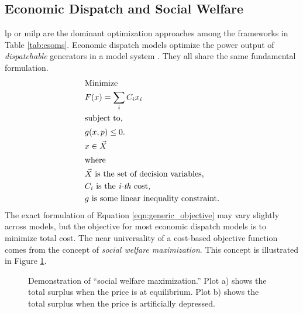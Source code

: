 \subsection{Economic Dispatch and Social Welfare}
\Ac{lp} or \ac{milp} are the dominant optimization approaches among the frameworks in 
Table \ref{tab:esoms}. Economic dispatch models optimize the power output of 
\textit{dispatchable} generators in a model system \cite{de_queiroz_repurposing_2019,
neumann_near-optimal_2021}. They all share the same fundamental formulation.
\begin{align}
    \intertext{Minimize}
    \label{eqn:generic_objective}
    &F(x) = \sum_i C_i x_i\\
    \intertext{subject to,}
    &g(x, p) \leq 0.\nonumber\\
    &x \in \vec{X}\nonumber\\
    \intertext{where}
    &\vec{X} \text{ is the set of decision variables,}\nonumber\\
    & C_i \text{ is the \textit{i-th} cost,}\nonumber\\
    & g \text{ is some linear inequality constraint.}\nonumber
\end{align}
The exact formulation of Equation \ref{eqn:generic_objective} may vary slightly 
across models, but the objective for most economic dispatch models is to minimize 
total cost. The near universality of a cost-based objective function comes from 
the concept of \textit{social welfare maximization}. This concept is illustrated 
in Figure \ref{fig:social-max}.

\begin{figure}[H]
  \centering
  \resizebox{\columnwidth}{!}{}
  \caption{Demonstration of ``social welfare maximization.'' Plot a) shows the total surplus when the price is at equilibrium. Plot b)
  shows the total surplus when the price is artificially depressed.}
  \label{fig:social-max}
\end{figure}

